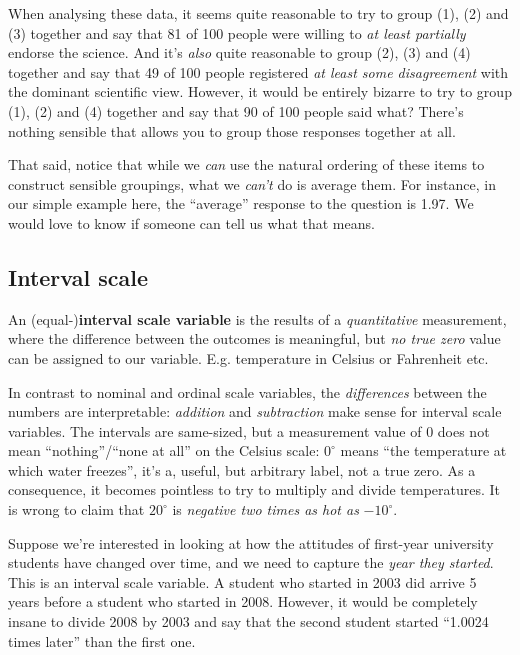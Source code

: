 \documentclass[
  11pt,
  a4paper,
  twoside,symmetric,openright]{book}
\theoremstyle{break}
\theoremstyle{break}
\begin{document}
\begin{example}
When analysing these data, it seems quite reasonable to try to group (1), (2) and (3) together and say that 81 of 100 people were willing to \emph{at least partially} endorse the science. And it's \emph{also} quite reasonable to group (2), (3) and (4) together and say that 49 of 100 people registered \emph{at least some disagreement} with the dominant scientific view. However, it would be entirely bizarre to try to group (1), (2) and (4) together and say that 90 of 100 people said what? There's nothing sensible that allows you to group those responses together at all.

That said, notice that while we \emph{can} use the natural ordering of these items to construct sensible groupings, what we \emph{can't} do is average them. For instance, in our simple example here, the ``average'' response to the question is 1.97. We would love to know if someone can tell us what that means.
\end{example}

\subsection{Interval scale}\label{intervalscale}

\begin{definition}
\protect\hypertarget{def:definterval}{}\label{def:definterval}An (equal-)\textbf{interval scale variable} is the results of a \emph{quantitative} measurement, where the difference between the outcomes is meaningful, but \emph{no true zero} value can be assigned to our variable. E.g. temperature in Celsius or Fahrenheit etc.
\end{definition}

In contrast to nominal and ordinal scale variables, the \emph{differences} between the numbers are interpretable: \emph{addition} and \emph{subtraction} make sense for interval scale variables. The intervals are same-sized, but a measurement value of 0 does not mean ``nothing''/``none at all'' on the Celsius scale: \(0^\circ\) means ``the temperature at which water freezes'', it's a, useful, but arbitrary label, not a true zero. As a consequence, it becomes pointless to try to multiply and divide temperatures. It is wrong to claim that \(20^\circ\) is \emph{negative two times as hot as} \(-10^\circ\).

\begin{example}
\protect\hypertarget{exm:exinterval}{}\label{exm:exinterval}Suppose we're interested in looking at how the attitudes of first-year university students have changed over time, and we need to capture the \emph{year they started}. This is an interval scale variable. A student who started in 2003 did arrive 5 years before a student who started in 2008. However, it would be completely insane to divide 2008 by 2003 and say that the second student started ``1.0024 times later'' than the first one.
\end{example}
\end{document}
